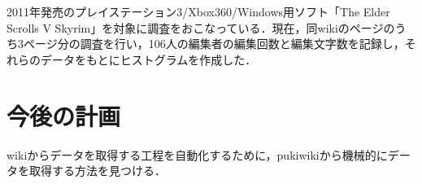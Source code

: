 \documentclass[uplatex,twocolumn,dvipdfmx]{jsarticle}
\begin{document}
2011年発売のプレイステーション3/Xbox360/Windows用ソフト「The Elder Scrolls V Skyrim」を対象に調査をおこなっている．現在，同wikiのページのうち3ページ分の調査を行い，106人の編集者の編集回数と編集文字数を記録し，それらのデータをもとにヒストグラムを作成した．

\section{今後の計画}

wikiからデータを取得する工程を自動化するために，pukiwikiから機械的にデータを取得する方法を見つける．
\nocite{*}

\end{document}
